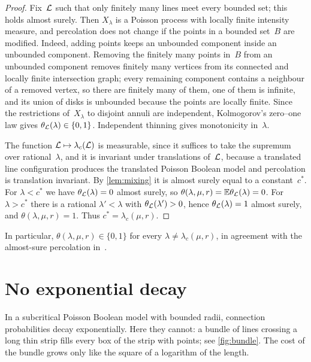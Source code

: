\documentclass[11pt,letterpaper]{article}
\begin{document}
\begin{proof}
Fix~$\mathcal L$ such that only finitely many lines meet every bounded set; this holds almost surely. Then $X_\lambda$ is a Poisson process with locally finite intensity measure, and percolation does not change if the points in a bounded set~$B$ are modified. Indeed, adding points keeps an unbounded component inside an unbounded component. Removing the finitely many points in~$B$ from an unbounded component removes finitely many vertices from its connected and locally finite intersection graph; every remaining component contains a neighbour of a removed vertex, so there are finitely many of them, one of them is infinite, and its union of disks is unbounded because the points are locally finite. Since the restrictions of~$X_\lambda$ to disjoint annuli are independent, Kolmogorov's zero--one law gives $\theta_\mathcal L(\lambda)\in\{0,1\}$. Independent thinning gives monotonicity in~$\lambda$.

The function $\mathcal L\mapsto\lambda_c(\mathcal L)$ is measurable, since it suffices to take the supremum over rational~$\lambda$, and it is invariant under translations of~$\mathcal L$, because a translated line configuration produces the translated Poisson Boolean model and percolation is translation invariant. By \cref{lem:mixing} it is almost surely equal to a constant~$c^*$. For $\lambda<c^*$ we have $\theta_\mathcal L(\lambda)=0$ almost surely, so $\theta(\lambda,\mu,r)=\mathbb E\theta_\mathcal L(\lambda)=0$. For $\lambda>c^*$ there is a rational $\lambda'<\lambda$ with $\theta_\mathcal L(\lambda')>0$, hence $\theta_\mathcal L(\lambda)=1$ almost surely, and $\theta(\lambda,\mu,r)=1$. Thus $c^*=\lambda_c(\mu,r)$.
\end{proof}

In particular, $\theta(\lambda,\mu,r)\in\{0,1\}$ for every $\lambda\neq\lambda_c(\mu,r)$, in agreement with the almost-sure percolation in~\cite[Theorem~2.1]{HJ26}.

\section{No exponential decay}
\label{sec:noexp}

In a subcritical Poisson Boolean model with bounded radii, connection probabilities decay exponentially. Here they cannot: a bundle of lines crossing a long thin strip fills every box of the strip with points; see \cref{fig:bundle}. The cost of the bundle grows only like the square of a logarithm of the length.
\end{document}
